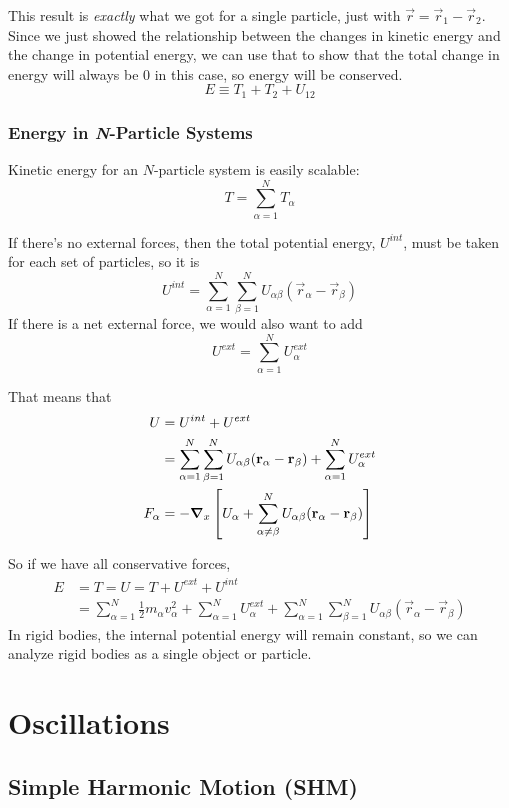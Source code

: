 \documentclass[a4paper]{article}
\begin{document}
This result is \emph{exactly} what we got for a single particle, just with
$\vec{r} = \vec{r}_1-\vec{r}_2$.
Since we just showed the relationship between the changes in kinetic energy and
the change in potential energy, we can use that to show that the total change
in energy will always be 0 in this case, so energy will be conserved.
\[
	E \equiv T_1+T_2+U_{12}
\]


\subsubsection{Energy in \emph{N}-Particle Systems}

Kinetic energy for an $N$-particle system is easily scalable:
\[
	T = \sum_{\alpha=1}^{N}T_{\alpha}
\]

If there's no external forces, then the total potential energy,
$U^{int}$, must be taken for each set of particles, so it is
\[
	U^{int} = \sum_{\alpha=1}^{N}\sum_{\beta=1}^{N}
	U_{\alpha\beta}(\vec{r}_{\alpha}-\vec{r}_{\beta})
\]
If there is a net external force, we would also want to add
\[
	U^{ext} = \sum_{\alpha=1}^{N} U_{\alpha}^{ext}
\]

That means that
\begin{align*}
	U &= U^{int} + U^{ext}\\
	  &= \sum_{\alpha=1}^{N}\sum_{\beta=1}^{N}U_{\alpha\beta}
		(\boldsymbol{\mathbf{r}}_{\alpha}-\boldsymbol{\mathbf{r}}_{\beta}) + 
		\sum_{\alpha=1}^{N} U_{\alpha}^{ext}\\
	F_{\alpha} &= -\boldsymbol{\mathbf{\nabla}}_x\left[U_{\alpha}+\sum_{\alpha\neq\beta}^{N}
		U_{\alpha\beta}(\boldsymbol{\mathbf{r}}_{\alpha}-\boldsymbol{\mathbf{r}}_{\beta})\right]
\end{align*}

So if we have all conservative forces,
\begin{align*}
	E &= T = U = T + U^{ext} + U^{int}\\
	  &= \sum_{\alpha=1}^{N} \frac{1}{2}m_\alpha v_\alpha^2 +
	\sum_{\alpha=1}^NU_{\alpha}^{ext} +
	\sum_{\alpha=1}^N\sum_{\beta=1}^NU_{\alpha\beta}(\vec{r}_{\alpha}-
		\vec{r}_{\beta})
\end{align*}
In rigid bodies, the internal potential energy will remain constant, so we can
analyze rigid bodies as a single object or particle.

\section{Oscillations}
\subsection{Simple Harmonic Motion (SHM)}
\end{document}
